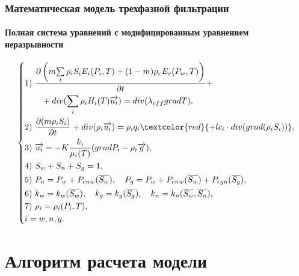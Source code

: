 \documentclass[10pt,pdf,hyperref={unicode}]{beamer} %
\begin{document}
\begin{frame}
\begin{center}
\frametitle{Математическая модель трехфазной фильтрации}
\framesubtitle{Полная система уравнений с модифицированным уравнением неразрывности}
\begin{equation*}
\left\{
  \begin{aligned}
    & \text{1)}\ \frac{\partial \left(m {\sum\limits_{i}{\rho_i S_i E_i(P_i, T)}} + (1-m){\rho_r E_r(P_w, T)}\right)}{\partial t} + \\
    & \qquad + div(\sum_{i}{\rho_i H_i(T) \overrightarrow{u_i}}) = div(\lambda_{eff} grad T),\\
    & \text{2)}\ \frac{\partial (m \rho_i S_i)}{\partial t}+ div(\rho_i \overrightarrow{u_i}) = \rho_i q_i\textcolor{red}{ + l c_i \cdot div(grad(\rho_i S_i))}, \\
    & \text{3)}\ \overrightarrow{u_i}=-K \frac{k_i}{{\mu_i(T)}}(grad P_i - {\rho}_i\overrightarrow{g}),\\
    & \text{4)}\ S_w + S_n + S_g=1,\\
    & \text{5)}\ P_n=P_w+P_{cnw}(\overline{S_w}),\quad P_g=P_w+P_{cnw}(\overline{S_w})+P_{cgn}(\overline{S_g}),\\
    & \text{6)}\ k_w=k_w(\overline{S_w}),\quad k_g=k_g(\overline{S_g}),\quad k_n=k_n(\overline{S_w},\overline{S_n}),\\
    & \text{7)}\ \rho_i=\rho_i(P_i,T),\\
    &i=w,n,g. \\
  \end{aligned}
\right.
\end{equation*}
\end{center}
\end{frame}

\section{Алгоритм расчета модели}
\end{document}
